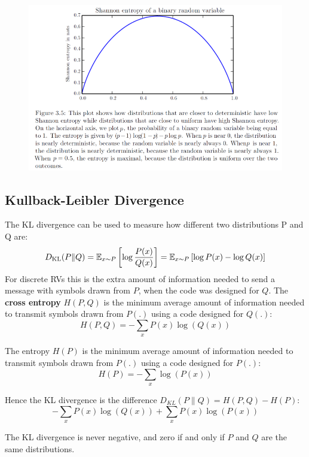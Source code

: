\begin{multicols}{2}
	\begin{figure}[H]
		\centering
		\includegraphics[width=1\linewidth]{images/shannon.png}
	\end{figure}

	\subsection{Kullback-Leibler Divergence}
	The KL divergence can be used to measure how different two distributions P and Q are:
	\[ D_{\text{KL}}(P\lVert Q) = \mathbb{E}_{x\sim P}\left[\log \frac{P(x)}{Q(x)}\right]=
	\mathbb{E}_{x\sim P}\left[\log {P(x)} - \log {Q(x)}\right]
	 \]
	For discrete RVs this is the extra amount of information needed to send a message with symbols drawn from $P$, when the code was designed for $Q$.
	The \textbf{cross entropy} $H(P,Q)$ is the minimum average amount of information needed to transmit symbols drawn from $P(.)$ using a code designed for $Q(.)$:
	\[ H(P,Q) = -\sum_{x} P(x)\log \left(Q(x)\right) \]

	The entropy $H(P)$ is the minimum average amount of information needed to transmit symbols drawn from $P(.)$ using a code designed for $P(.)$:
	\[ H(P) = -\sum_{x} \log\left(P(x)\right) \]

  Hence the KL divergence is the difference $D_{KL}(P\lVert Q)=H(P,Q)-H(P)$:
  \[ -\sum_{x} P(x)\log \left(Q(x)\right) +\sum_{x} P(x)\log \left(P(x)\right) \]

	The KL divergence is never negative, and zero if and only if $P$ and $Q$ are the same distributions.

\end{multicols}
\newpage
